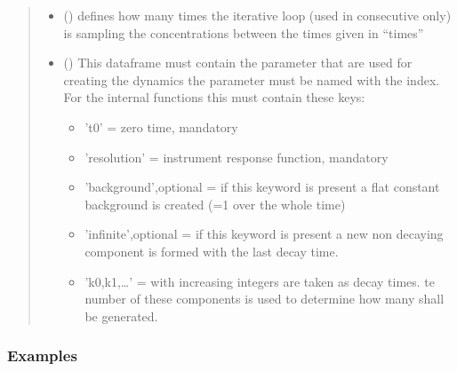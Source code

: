 \documentclass[letterpaper,10pt,english]{sphinxmanual}
\begin{document}
\begin{fulllineitems}
\begin{quote}
\begin{description}
\begin{itemize}
\item {} 
 (\sphinxstyleliteralemphasis{\sphinxupquote{, }}) \textendash{} defines how many times the iterative loop (used in consecutive only) is sampling the concentrations
between the times given in “times”

\item {} 
 () \textendash{} 
This dataframe must contain the parameter that are used for creating the dynamics
the parameter must be named with the index.
For the internal functions this must contain these keys:
\begin{itemize}
\item {} 
’t0’ = zero time, mandatory

\item {} 
’resolution’ = instrument response function, mandatory

\item {} 
’background’,optional = if this keyword is present a flat constant background is created (=1 over the whole time)

\item {} 
’infinite’,optional = if this keyword is present a new non decaying component is formed with the last decay time.

\item {} 
’k0,k1,…’ = with increasing integers are taken as decay times. te number of these components is used to determine how many shall be generated.

\end{itemize}


\end{itemize}

\end{description}\end{quote}
\subsubsection*{Examples}

\end{fulllineitems}

\end{document}
